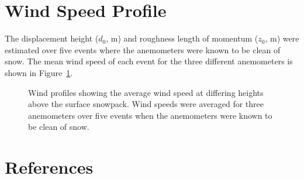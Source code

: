\documentclass[
  letterpaper,
  DIV=11,
  numbers=noendperiod]{scrartcl}
\begin{document}
\section{Wind Speed Profile}\label{wind-speed-profile}

The displacement height (\(d_0\), m) and roughness length of momentum
(\(z_0\), m) were estimated over five events where the anemometers were
known to be clean of snow. The mean wind speed of each event for the
three different anemometers is shown in Figure~\ref{fig-ws-events}.

\begin{figure}[H]


\caption{\label{fig-ws-events}Wind profiles showing the average wind
speed at differing heights above the surface snowpack. Wind speeds were
averaged for three anemometers over five events when the anemometers
were known to be clean of snow.}

\end{figure}%

\pagebreak

\section*{References}\label{references}
\end{document}

